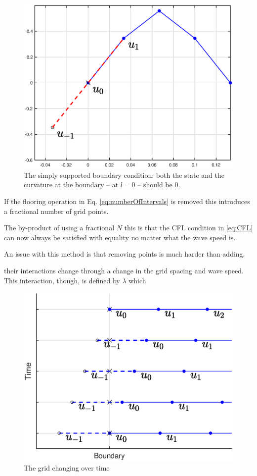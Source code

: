 \documentclass[dvipsnames, reprint]{JASA}
\def\SWcomment[#1]{\textcolor{Bittersweet}{#1}}
\begin{document}
\begin{figure}
\includegraphics[width=\reprintcolumnwidth]{simplySupportedBoundary}
\caption{\label{fig:simplySupportedBound}{The simply supported boundary condition: both the state and the curvature at the boundary -- at $l=0$ -- should be $0$.}}
\end{figure} 

If the flooring operation in Eq. \eqref{eq:numberOfIntervals} is removed this introduces a fractional number of grid points.


The by-product of using a fractional $N$ this is that the CFL condition in \eqref{eq:CFL} can now always be satisfied with equality no matter what the wave speed is.

An issue with this method is that removing points is much harder than adding.

their interactions change through a change in the grid spacing and wave speed. This interaction, though, is defined by $\lambda$ which 

\begin{figure}
\includegraphics[width=\reprintcolumnwidth]{boundaryGrid}
\caption{\label{fig:changingBoundary}{The grid changing over time}}
\end{figure} 


\end{document}
